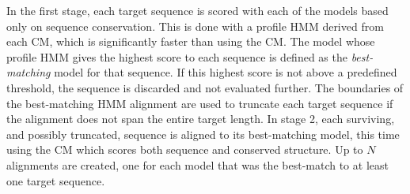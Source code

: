 In the first stage, each target sequence is scored with each of the
models based only on sequence conservation. This is done with a
profile HMM derived from each CM, which is significantly faster than
using the CM\@.  The model whose profile HMM gives the highest score to
each sequence is defined as the \emph{best-matching} model for that
sequence. If this highest score is not above a predefined threshold,
the sequence is discarded and not evaluated further. The boundaries of
the best-matching HMM alignment are used to truncate each target
sequence if the alignment does not span the entire target length.  In
stage 2, each surviving, and possibly truncated, sequence is aligned
to its best-matching model, this time using the CM which scores
both sequence and conserved structure. Up to $N$ alignments are
created, one for each model that was the best-match to at least one
target sequence.

